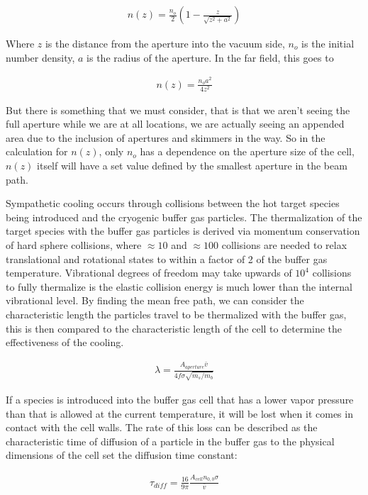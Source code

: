 \documentclass[a4paper]{article}
\begin{document}
\begin{align}
n(z)=\frac{n_o}{2}\left(1-\frac{z}{\sqrt{z^2+a^2}}\right)
\end{align}

Where $z$ is the distance from the aperture into the vacuum side, $n_o$ is the initial number density, $a$ is the radius of the aperture. In the far field, this goes to

\begin{align}
n(z)=\frac{n_o a^2}{4 z^2}
\end{align}

But there is something that we must consider, that is that we aren't seeing the full aperture while we are at all locations, we are actually seeing an appended area due to the inclusion of apertures and skimmers in the way. So in the calculation for $n(z)$, only $n_o$ has a dependence on the aperture size of the cell, $n(z)$ itself will have a set value defined by the smallest aperture in the beam path.

Sympathetic cooling occurs through collisions between the hot target species being introduced and the cryogenic buffer gas particles. The thermalization of the target species with the buffer gas particles is derived via momentum conservation of hard sphere collisions, where $\approx 10$ and $\approx 100$ collisions are needed to relax translational and rotational states to within a factor of 2 of the buffer gas temperature. Vibrational degrees of freedom may take upwards of $10^4$ collisions to fully thermalize is the elastic collision energy is much lower than the internal vibrational level. By finding the mean free path, we can consider the characteristic length the particles travel to be thermalized with the buffer gas, this is then compared to the characteristic length of the cell to determine the effectiveness of the cooling.

\begin{align}
\lambda = \frac{A_{aperture} \bar{v}}{4 f \sigma \sqrt{m_s/m_b}}
\end{align}

If a species is introduced into the buffer gas cell that has a lower vapor pressure than that is allowed at the current temperature, it will be lost when it comes in contact with the cell walls. The rate of this loss can be described as the  characteristic time of diffusion of a particle in the buffer gas to the physical dimensions of the cell set the diffusion time constant:

\begin{align}
\tau_{diff} = \frac{16}{9 \pi} \frac{A_{cell} n_{0,b} \sigma}{\bar{v}}
\end{align}
\end{document}
